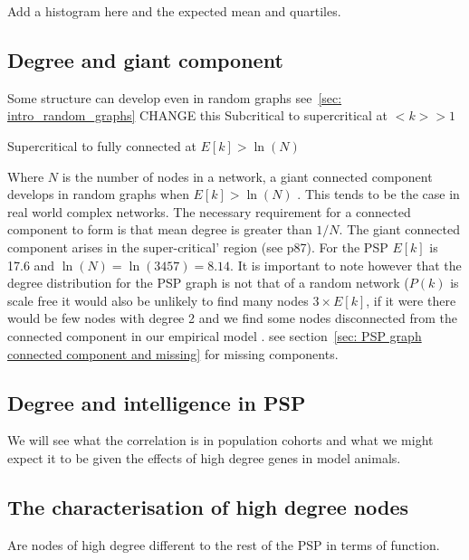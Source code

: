 Add a histogram here and the expected mean and quartiles.


\subsection{Degree and giant component}
\label{sec:connected component and degree}
Some structure can develop even in random graphs see~\ref{sec: intro_random_graphs}
 CHANGE this
Subcritical to supercritical at $<k> >1$


Supercritical to fully connected at $E[k] > \ln(N)$


Where $N$ is the number of nodes in a network, a giant connected component develops in random graphs when $E[k] > \ln (N)$ \cite{barabasi2016network}. This tends to be the case in real world complex networks. The necessary requirement for a connected component to form is that mean degree is greater than $1/N$. The giant connected component arises in the super-critical' region (see \cite{barabasi2016network} p87). For the PSP $E[k]$ is 17.6 and $\ln(N)=\ln(3457)=8.14$. It is important to note however that the degree distribution for the PSP graph is not that of a random network ($P(k)$ is scale free it would also be unlikely to find many nodes $ 3 \times E[k]$, if it were there would be few nodes with degree 2 and we find some nodes disconnected from the connected component in our empirical model .   see section~\ref{sec: PSP graph connected component and missing} for missing components.


\subsection{Degree and intelligence in PSP}
We will see what the correlation is in population cohorts and what we might expect it to be given the effects of high degree genes in model animals. 

\subsection{The characterisation of high degree nodes}
Are nodes of high degree different to the rest of the PSP in terms of function. 

